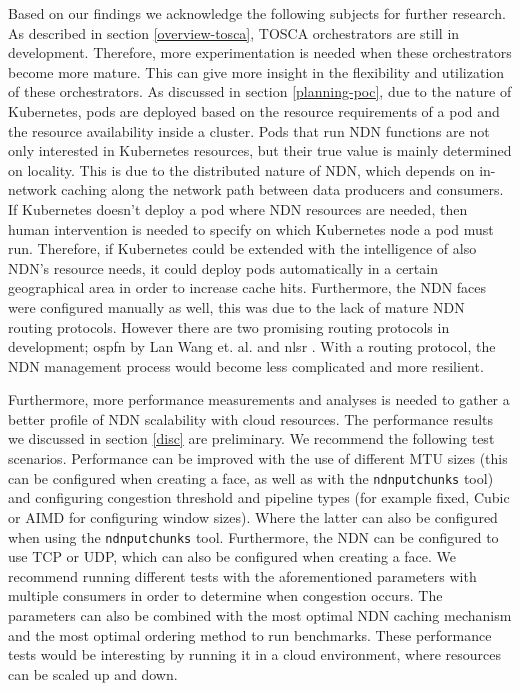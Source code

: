 Based on our findings we acknowledge the following subjects for further research. As described in section \ref{overview-tosca}, TOSCA orchestrators are still in development. Therefore, more experimentation is needed when these orchestrators become more mature. This can give more insight in the flexibility and utilization of these orchestrators. As discussed in section \ref{planning-poc}, due to the nature of Kubernetes, pods are deployed based on the resource requirements of a pod and the resource availability inside a cluster. Pods that run NDN functions are not only interested in Kubernetes resources, but their true value is mainly determined on locality. This is due to the distributed nature of NDN, which depends on in-network caching along the network path between data producers and consumers. If Kubernetes doesn't deploy a pod where NDN resources are needed, then human intervention is needed to specify on which Kubernetes node a pod must run. Therefore, if Kubernetes could be extended with the intelligence of also NDN's resource needs, it could deploy pods automatically in a certain geographical area in order to increase cache hits. Furthermore, the NDN faces were configured manually as well, this was due to the lack of mature NDN routing protocols. However there are two promising routing protocols in development; \gls{ospfn} by Lan Wang et. al. \cite{ndn-ospfn1, ndn-ospfn2} and \gls{nlsr} \cite{nlsr}. With a routing protocol, the NDN management process would become less complicated and more resilient.

Furthermore, more performance measurements and analyses is needed to gather a better profile of NDN scalability with cloud resources. The performance results we discussed in section \ref{disc} are preliminary. We recommend the following test scenarios. Performance can be improved with the use of different MTU sizes (this can be configured when creating a face, as well as with the \texttt{ndnputchunks} tool) and configuring congestion threshold and pipeline types (for example fixed, Cubic or AIMD for configuring window sizes). Where the latter can also be configured when using the \texttt{ndnputchunks} tool. Furthermore, the NDN can be configured to use TCP or UDP, which can also be configured when creating a face. We recommend running different tests with the aforementioned parameters with multiple consumers in order to determine when congestion occurs. The parameters can also be combined with the most optimal NDN caching mechanism and the most optimal ordering method \cite{koulouzis2018information} to run benchmarks. These performance tests would be interesting by running it in a cloud environment, where resources can be scaled up and down.

